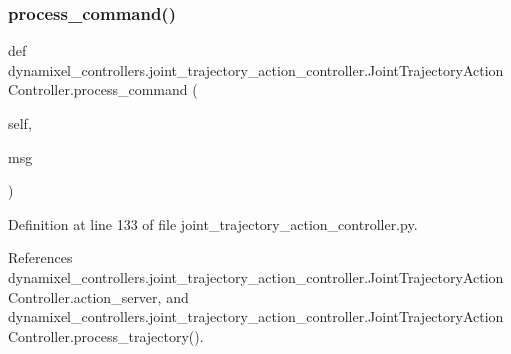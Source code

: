 \subsubsection{\texorpdfstring{process\+\_\+command()}{process\_command()}}
{\footnotesize\ttfamily def dynamixel\+\_\+controllers.\+joint\+\_\+trajectory\+\_\+action\+\_\+controller.\+Joint\+Trajectory\+Action\+Controller.\+process\+\_\+command (\begin{DoxyParamCaption}\item[{}]{self,  }\item[{}]{msg }\end{DoxyParamCaption})}



Definition at line 133 of file joint\+\_\+trajectory\+\_\+action\+\_\+controller.\+py.



References dynamixel\+\_\+controllers.\+joint\+\_\+trajectory\+\_\+action\+\_\+controller.\+Joint\+Trajectory\+Action\+Controller.\+action\+\_\+server, and dynamixel\+\_\+controllers.\+joint\+\_\+trajectory\+\_\+action\+\_\+controller.\+Joint\+Trajectory\+Action\+Controller.\+process\+\_\+trajectory().


